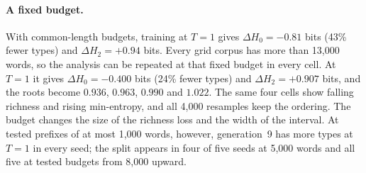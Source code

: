\documentclass[10pt]{article}
\theoremstyle{plain}
\theoremstyle{definition}
\newcommand{\Htwo}{H_2}
\newcommand{\Hz}{H_0}
\begin{document}
\paragraph{A fixed budget.} With common-length budgets, training at $T=1$ gives
$\Delta\Hz=-0.81$ bits (43\% fewer types) and $\Delta\Htwo=+0.94$ bits. Every grid corpus has
more than 13,000 words, so the analysis can be repeated at that fixed budget in every cell. At
$T=1$ it gives $\Delta\Hz=-0.400$ bits (24\% fewer types) and $\Delta\Htwo=+0.907$ bits, and
the roots become $0.936$, $0.963$, $0.990$ and $1.022$. The same four cells show falling
richness and rising min-entropy, and all 4,000 resamples keep the ordering. The budget changes
the size of the richness loss and the width of the interval. At tested prefixes of at most
1,000 words, however, generation~9 has more types at $T=1$ in every seed; the split appears
in four of five seeds at 5,000 words and all five at tested budgets from 8,000 upward.
\end{document}
